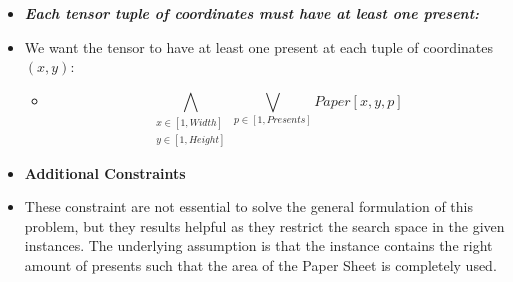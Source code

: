 \begin{itemize}
\begin{itemize}
\begin{adjustwidth}{-2.0cm}{}
\begin{equation*}
\begin{split}
            &\eqindent \bigvee_{
                \substack{
                    x_0 \in [1, Width - dx]\\
                    y_0 \in [1, Height - dy]
                }
            }
            (\bigwedge_{
                \substack{
                    x \in [x_0, x_0 + dx] \\
                    y \in [y_0, y_0 + dy]
                }
             } Paper[x, y, p])
             \vee
            (\bigwedge_{
                \substack{
                    x \in [1, x_0] \cup [x_0 + dx + 1, Width]\\
                    y \in [1, y_0] \cup [y_0 + dy + 1, Height]
                }
             } \neg Paper[x, y, p]) 
        \end{split}\end{equation*}\end{adjustwidth}
        \item[] So we end up with the full constrain:\\
        \begin{equation*} \bigwedge_{p \in [1, Presents]} correct\_dimension(p, Dimension_x[p], Dimension_y[p]) \end{equation*}  
    \end{itemize}
    \item \textbf{\textit{Each tensor tuple of coordinates must have at least one present:}}
    \item[] We want the tensor to have at least one present at each tuple of coordinates $(x, y)$:
    \begin{itemize}
        \item[] \begin{equation*}
            \bigwedge_{
                \substack{
                    x \in [1, Width]\\
                    y \in [1, Height]
                }
            } \bigvee_{p \in [1, Presents]} Paper[x, y, p]
        \end{equation*}
    \end{itemize}
    \newpage
    \item[] \textbf{Additional Constraints}
    \item[] These constraint are not essential to solve the general formulation of this problem,
        but they results helpful as they restrict the search space in the given instances.
        The underlying assumption is that the instance contains the right amount of presents such
        that the area of the Paper Sheet is completely used.

\end{itemize}
